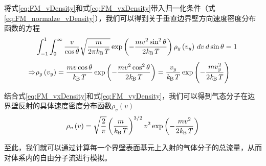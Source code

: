     将式\ref{eq:FM_vDensity}和式\ref{eq:FM_vxDensity}带入归一化条件（式\ref{eq:FM_normalze_vDensity}），我们可以得到关于垂直边界壁方向速度密度分布函数的方程\chinesecolon
    \begin{equation}
        \label{eq:FM_vyDensity}
        \begin{split}
            & \int_{-1}^{1} \int_{0}^{\infty} \frac{v}{\cos\theta} \sqrt{\frac{m}{2\pi\it k_{\rm B} \it T}}\exp\left({-\frac{mv^2\sin^2\theta}{2\it k_{\rm B} \it T}}\right)\rho_y\left(v_y\right) \,dv  \,d\sin\theta =1\\[+1ex]
\Rightarrow & \rho_y\left(v_y\right)=\frac{mv\cos\theta}{\it k_{\rm B} \it T}\exp\left({-\frac{mv^2\cos^2\theta}{2\it k_{\rm B} \it T}}\right)=\frac{v_y}{\it k_{\rm B} \it T}\exp\left(-\frac{mv_y^2}{2\it k_{\rm B} \it T}\right)
        \end{split}
    \end{equation}

    结合式\ref{eq:FM_vxDensity}和式\ref{eq:FM_vyDensity}，我们可以得到气态分子在边界壁反射的具体速度密度分布函数$\rho_v\left(v\right)$\chinesecolon
    \begin{equation}
        \rho_v\left(v\right)=\sqrt{\frac{2}{\pi}} \left(\frac{m}{\it k_{\rm B} \it T}\right)^{3/ 2}v^2\exp{\left(-\frac{mv^2}{2\it k_{\rm B} \it T}\right)}
    \end{equation}

    至此，我们就可以通过计算每一个界壁表面基元上入射的气体分子的总流量，从而对体系内的自由分子流进行模拟。